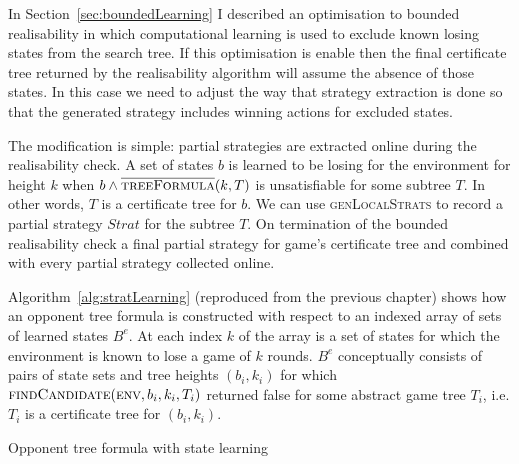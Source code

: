 In Section~\ref{sec:boundedLearning} I described an optimisation to bounded realisability in which computational learning is used to exclude known losing states from the search tree. If this optimisation is enable then the final certificate tree returned by the realisability algorithm will assume the absence of those states. In this case we need to adjust the way that strategy extraction is done so that the generated strategy includes winning actions for excluded states. 

The modification is simple: partial strategies are extracted online during the realisability check. A set of states $b$ is learned to be losing for the environment for height $k$ when $b \land \textsc{$\overline{\mbox{treeFormula}}$}(k, T)$ is unsatisfiable for some subtree $T$. In other words, $T$ is a certificate tree for $b$. We can use \textsc{genLocalStrats} to record a partial strategy $Strat$ for the subtree $T$. On termination of the bounded realisability check a final partial strategy for game's certificate tree and combined with every partial strategy collected online. 

Algorithm~\ref{alg:stratLearning} (reproduced from the previous chapter) shows how an opponent tree formula is constructed with respect to an indexed array of sets of learned states $B^e$. At each index $k$ of the array is a set of states for which the environment is known to lose a game of $k$ rounds. $B^e$ conceptually consists of pairs of state sets and tree heights $(b_i, k_i)$ for which $\textsc{findCandidate}(\textsc{env}, b_i, k_i, T_i)$ returned false for some abstract game tree $T_i$, i.e. $T_i$ is a certificate tree for $(b_i, k_i)$.

\begin{algorithm}
    \caption{Opponent tree formula with state learning}
    \label{alg:stratLearning}
    \begin{algorithmic}[1]
        \State {}
        \Else
        \State {}
        \EndIf
        \EndFunction
    \end{algorithmic}
\end{algorithm}

